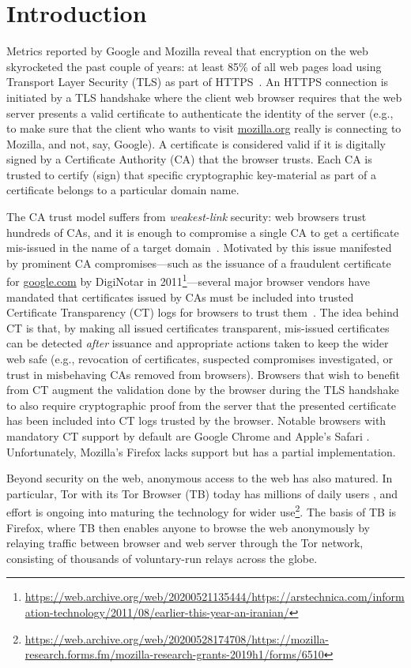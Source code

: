 \section{Introduction} \label{sec:introduction}
Metrics reported by Google and Mozilla reveal that encryption on the web
skyrocketed the past couple of years: at least 85\% of all web pages load using
Transport Layer Security (TLS) as part of
HTTPS~\cite{google-metrics,mozilla-metrics}. An HTTPS connection is initiated by
a TLS handshake where the client web browser requires that the web server
presents a valid certificate to authenticate the identity of the server (e.g.,
to make sure that the client who wants to visit \url{mozilla.org} really is
connecting to Mozilla, and not, say, Google). A certificate is considered valid
if it is digitally signed by a Certificate Authority (CA) that the browser
trusts. Each CA is trusted to certify (sign) that specific cryptographic
key-material as part of a certificate belongs to a particular domain name.

The CA trust model suffers from \emph{weakest-link} security: web browsers trust
hundreds of CAs, and it is enough to compromise a single CA to get a certificate
mis-issued in the name of a target domain~\cite{ca-ecosystem,https-sok}.
Motivated by this issue manifested by prominent CA compromises---such as the
issuance of a fraudulent certificate for \url{google.com} by DigiNotar in
2011\footnote{\url{https://web.archive.org/web/20200521135444/https://arstechnica.com/information-technology/2011/08/earlier-this-year-an-iranian/}}---several
major browser vendors have mandated that certificates issued by CAs must be
included into trusted Certificate Transparency (CT) logs for browsers to trust
them~\cite{ct/a,ct,ct/bis}. The idea behind CT is that, by making all issued
certificates transparent, mis-issued certificates can be detected \emph{after}
issuance and appropriate actions taken to keep the wider web safe (e.g.,
revocation of certificates, suspected compromises investigated, or trust in
misbehaving CAs removed from browsers). Browsers that wish to benefit from CT
augment the validation done by the browser during the TLS handshake to also
require cryptographic proof from the server that the presented certificate has
been included into CT logs trusted by the browser. Notable browsers with
mandatory CT support by default are Google Chrome and Apple's Safari
\cite{chrome-policy,safari-policy}. Unfortunately, Mozilla's Firefox lacks
support but has a partial implementation.

Beyond security on the web, anonymous access to the web has also matured. In
particular, Tor with its Tor Browser (TB) today has millions of daily users
\cite{tor,mani}, and effort is ongoing into maturing the technology for wider
use\footnote{\url{https://web.archive.org/web/20200528174708/https://mozilla-research.forms.fm/mozilla-research-grants-2019h1/forms/6510}}.
The basis of TB is Firefox, where TB then enables anyone to browse the web
anonymously by relaying traffic between browser and web server through the Tor
network, consisting of thousands of voluntary-run relays across the globe. 

